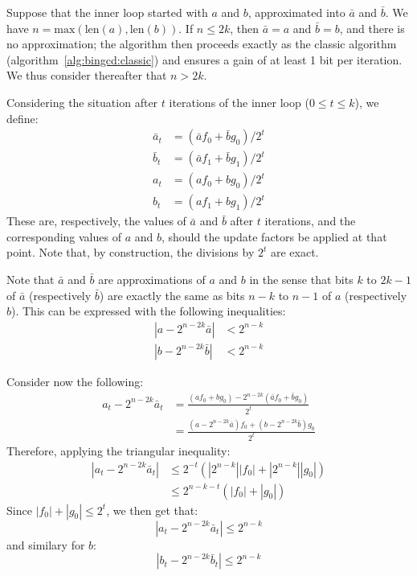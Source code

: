 \documentclass{llncs}
\newcommand{\bitlength}{\text{len}}
\begin{document}
Suppose that the inner loop started with $a$ and $b$, approximated into
$\bar a$ and $\bar b$. We have $n = \text{max}(\bitlength(a),
\bitlength(b))$. If $n \leq 2k$, then $\bar a = a$ and $\bar b = b$, and
there is no approximation; the algorithm then proceeds exactly as the
classic algorithm (algorithm~\ref{alg:bingcd:classic}) and ensures a
gain of at least 1 bit per iteration. We thus consider thereafter that
$n > 2k$.

Considering the situation after $t$ iterations of the inner loop
($0\leq t\leq k$), we define:
\begin{align*}
    \bar a_t &= (\bar a f_0 + \bar b g_0)/2^t \\
    \bar b_t &= (\bar a f_1 + \bar b g_1)/2^t \\
    a_t &= (a f_0 + b g_0)/2^t \\
    b_t &= (a f_1 + b g_1)/2^t
\end{align*}
These are, respectively, the values of $\bar a$ and $\bar b$ after $t$
iterations, and the corresponding values of $a$ and $b$, should the
update factors be applied at that point. Note that, by construction, the
divisions by $2^t$ are exact.

Note that $\bar a$ and $\bar b$ are approximations of $a$ and $b$ in the
sense that bits $k$ to $2k-1$ of $\bar a$ (respectively $\bar b$) are
exactly the same as bits $n-k$ to $n-1$ of $a$ (respectively $b$). This
can be expressed with the following inequalities:
\begin{align*}
    |a - 2^{n-2k} \bar a| &< 2^{n-k} \\
    |b - 2^{n-2k} \bar b| &< 2^{n-k}
\end{align*}

Consider now the following:
\begin{align*}
    a_t - 2^{n-2k} \bar a_t
        &= \frac{(af_0 + bg_0) - 2^{n-2k}(\bar a f_0 + \bar b g_0)}{2^t} \\
        &= \frac{(a - 2^{n-2k} \bar a)f_0 + (b - 2^{n-2k} \bar b)g_0}{2^t}
\end{align*}
Therefore, applying the triangular inequality:
\begin{align*}
    |a_t - 2^{n-2k} \bar a_t|
        &\leq 2^{-t} (|2^{n-k}| |f_0| + |2^{n-k}| |g_0|) \\
        &\leq 2^{n-k-t} (|f_0| + |g_0|)
\end{align*}
Since $|f_0| + |g_0| \leq 2^t$, we then get that:
\begin{equation*}
    |a_t - 2^{n-2k} \bar a_t| \leq 2^{n-k}
\end{equation*}
and similary for $b$:
\begin{equation*}
    |b_t - 2^{n-2k} \bar b_t| \leq 2^{n-k}
\end{equation*}
\end{document}
